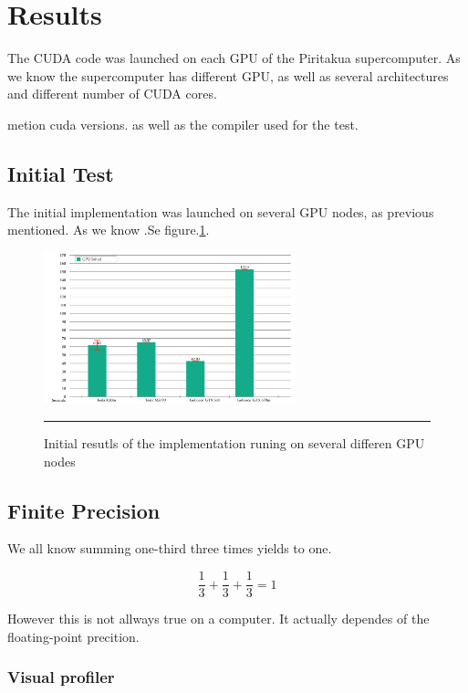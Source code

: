\section{Results}

The CUDA code was launched on each GPU of the Piritakua supercomputer. As we know the supercomputer has different GPU, as well as several architectures and different number of CUDA cores.


metion cuda versions. as well as the compiler used for the test.


\subsection{Initial Test}

The initial implementation was launched on several GPU nodes, as previous mentioned.  As we know .Se figure.\ref{fig:iniresults}.

\begin{figure}[htbp]
	\centering
		\includegraphics[width=0.65\textwidth]{Figures/initial_results.png}
		\rule{35em}{0.2pt}
	\caption[Initial GPU results]{Initial resutls of the implementation runing on several differen GPU nodes}
	\label{fig:iniresults}
\end{figure}


\subsection{Finite Precision}

We all know summing one-third three times yields to one.

$$\dfrac{1}{3} + \dfrac{1}{3} + \dfrac{1}{3} = 1$$

 However this is not allways true on a computer. It actually dependes of the floating-point precition. 


\subsubsection{Visual profiler}


